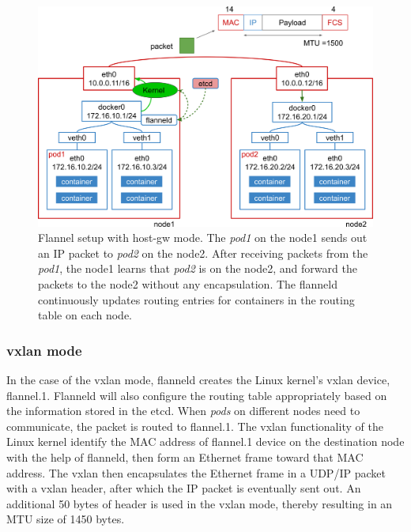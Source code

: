 \begin{figure}[h]
  \centering
  \includegraphics[width=0.95\columnwidth]{Figs/flannel-host-gw}

  \par\bigskip
  \centering
  \begin{minipage}{0.9\columnwidth}
    \caption[Flannel setup with host-gw mode]{
      Flannel setup with host-gw mode.
      The {\em pod1} on the node1 sends out an IP packet to {\em pod2} on the node2.
      After receiving packets from the {\em pod1}, the node1 learns that {\em pod2} is on the node2, and forward the packets to the node2 without any encapsulation.
      The flanneld continuously updates routing entries for containers in the routing table on each node.
    }
    \label{Figs/flannel-host-gw}
  \end{minipage}
\end{figure}

\FloatBarrier

\subsubsection{vxlan mode}

In the case of the vxlan mode, flanneld creates the Linux kernel's vxlan device, flannel.1. 
Flanneld will also configure the routing table appropriately based on the information stored in the etcd.
When {\em pods} on different nodes need to communicate, the packet is routed to flannel.1.
The vxlan functionality of the Linux kernel identify the MAC address of flannel.1 device on the destination node with the help of flanneld, then form an Ethernet frame toward that MAC address.
The vxlan then encapsulates the Ethernet frame in a UDP/IP packet with a vxlan header, after which the IP packet is eventually sent out.
An additional 50 bytes of header is used in the vxlan mode, thereby resulting in an MTU size of 1450 bytes.

